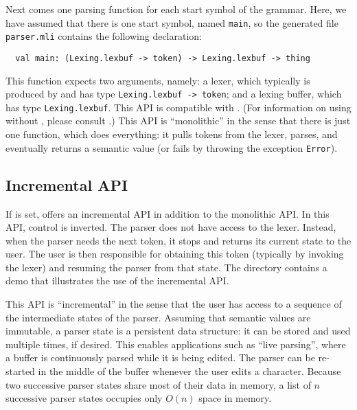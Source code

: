 \documentclass[onecolumn,11pt,nocopyrightspace,preprint]{sigplanconf}
\begin{document}

Next comes one parsing function for each start symbol of the grammar. Here, we
have assumed that there is one start symbol, named \verb+main+, so the
generated file \texttt{parser.mli} contains the following declaration:
\begin{verbatim}
  val main: (Lexing.lexbuf -> token) -> Lexing.lexbuf -> thing
\end{verbatim}
This function expects two arguments, namely: a lexer, which typically is produced by
\ocamllex and has type \verb+Lexing.lexbuf -> token+; and a lexing buffer,
which has type \verb+Lexing.lexbuf+. This API is compatible with
\ocamlyacc. (For information on using \menhir without \ocamllex, please
consult .)
%
This API is ``monolithic'' in the sense that there is just one function, which
does everything: it pulls tokens from the lexer, parses, and eventually
returns a semantic value (or fails by throwing the exception \texttt{Error}).


\subsection{Incremental API}
\label{sec:incremental}

If \otable is set, \menhir offers an incremental API in addition to the
monolithic API. In this API, control is inverted. The parser does not have
access to the lexer. Instead, when the parser needs the next token, it stops
and returns its current state to the user. The user is then responsible for
obtaining this token (typically by invoking the lexer) and resuming the parser
from that state.
%
The directory  contains a demo that
illustrates the use of the incremental API.

This API is ``incremental'' in the sense that the user has access to a
sequence of the intermediate states of the parser. Assuming that semantic
values are immutable, a parser state is a persistent data structure: it can be
stored and used multiple times, if desired. This enables applications such as
``live parsing'', where a buffer is continuously parsed while it is being
edited. The parser can be re-started in the middle of the buffer whenever the
user edits a character. Because two successive parser states share most of
their data in memory, a list of $n$ successive parser states occupies only
$O(n)$ space in memory.
\end{document}
